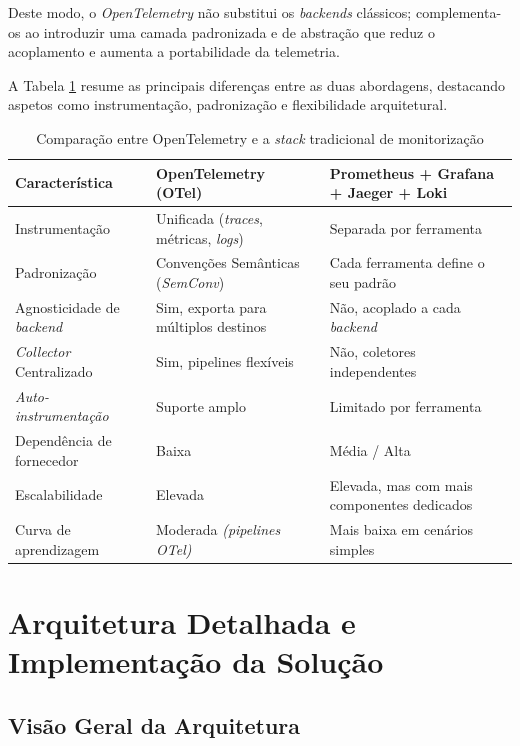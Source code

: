 Deste modo, o \textit{OpenTelemetry} não substitui os \textit{backends} clássicos; complementa-os ao introduzir uma camada padronizada e de abstração que reduz o acoplamento e aumenta a portabilidade da telemetria.

A Tabela \ref{tab:otel_vs_tradicional} resume as principais diferenças entre as duas abordagens, destacando aspetos como instrumentação, padronização e flexibilidade arquitetural.

\begin{table}[h!]
\centering
\caption{Comparação entre OpenTelemetry e a \textit{stack} tradicional de monitorização}
\label{tab:otel_vs_tradicional}
\begin{tabular}{|p{4cm}|p{5cm}|p{5cm}|}
\hline
\textbf{Característica} & \textbf{OpenTelemetry (OTel)} & \textbf{Prometheus + Grafana + Jaeger + Loki} \\ \hline

Instrumentação & Unificada (\textit{traces}, métricas, \textit{logs}) & Separada por ferramenta \\ \hline
Padronização & Convenções Semânticas (\textit{SemConv}) & Cada ferramenta define o seu padrão \\ \hline
Agnosticidade de \textit{backend} & Sim, exporta para múltiplos destinos & Não, acoplado a cada \textit{backend} \\ \hline
\textit{Collector} Centralizado & Sim, pipelines flexíveis & Não, coletores independentes \\ \hline
\textit{Auto-instrumentação} & Suporte amplo & Limitado por ferramenta \\ \hline
Dependência de fornecedor & Baixa & Média / Alta \\ \hline
Escalabilidade & Elevada & Elevada, mas com mais componentes dedicados \\ \hline
Curva de aprendizagem & Moderada \textit{(pipelines OTel)} & Mais baixa em cenários simples \\ \hline

\end{tabular}
\end{table}

\clearpage

\section{Arquitetura Detalhada e Implementação da Solução}

\subsection{Visão Geral da Arquitetura}

